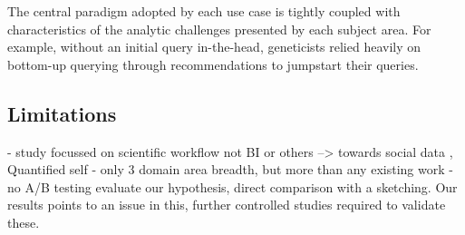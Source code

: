 The central paradigm adopted by each use case is tightly coupled with characteristics of the analytic challenges presented by each subject area. For example, without an initial query in-the-head, geneticists relied heavily on bottom-up querying through recommendations to jumpstart their queries. 
\subsection{Limitations}
- study focussed on scientific workflow not BI or others --> towards social data , Quantified self
- only 3 domain area breadth, but more than any existing work
- no A/B testing evaluate our hypothesis, direct comparison with a sketching. Our results points to an issue in this, further controlled studies required to validate these.